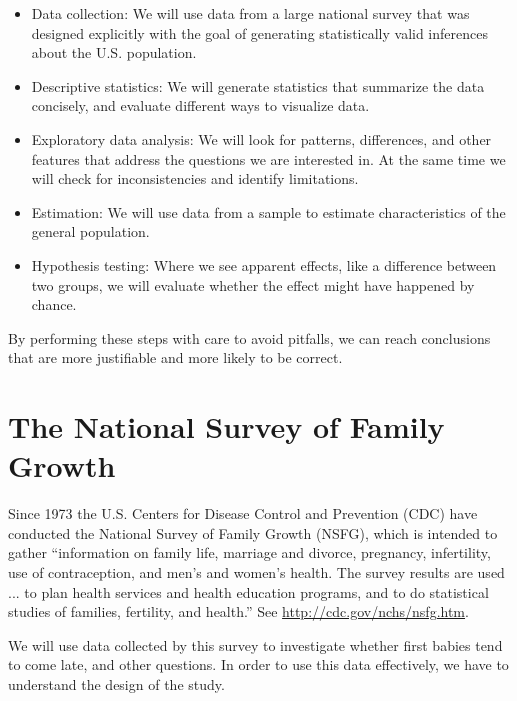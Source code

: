 \documentclass[12pt]{book}
\begin{document}
\begin{itemize}

\item Data collection: We will use data from a large national survey
  that was designed explicitly with the goal of generating
  statistically valid inferences about the U.S. population.

\item Descriptive statistics: We will generate statistics that
  summarize the data concisely, and evaluate different ways to
  visualize data.

\item Exploratory data analysis: We will look for
  patterns, differences, and other features that address the questions
  we are interested in.  At the same time we will check for
  inconsistencies and identify limitations.

\item Estimation: We will use data from a sample to estimate
  characteristics of the general population.

\item Hypothesis testing: Where we see apparent effects, like a
  difference between two groups, we will evaluate whether the effect
  might have happened by chance.

\end{itemize}

By performing these steps with care to avoid pitfalls, we can
reach conclusions that are more justifiable and more likely to be
correct.


\section{The National Survey of Family Growth}
\label{nsfg}

Since 1973 the U.S. Centers for Disease Control and Prevention (CDC)
have conducted the National Survey of Family Growth (NSFG),
which is intended to gather ``information on family life, marriage and
divorce, pregnancy, infertility, use of contraception, and men's and
women's health. The survey results are used ... to plan health services and
health education programs, and to do statistical studies of families,
fertility, and health.''  See
  \url{http://cdc.gov/nchs/nsfg.htm}.

We will use data collected by this survey to investigate whether first
babies tend to come late, and other questions.  In order to use this
data effectively, we have to understand the design of the study.
\end{document}
